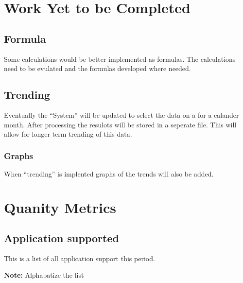\documentclass{article}
\begin{document}
\section{Work Yet to be Completed}
\subsection{Formula}
Some calculations would be better implemented as formulas. The calculations need
to be evulated and the formulas developed where needed.
\subsection{Trending}
Eventually the ``System'' will be updated to select the data on a for a calander
month. After processing the resulots will be stored in a seperate file.
This will allow for longer term trending of this data.
\subsubsection{Graphs}
When ``trending'' is implented graphs of the trends will also be added.


\section{Quanity Metrics}
\subsection{Application supported}
This is a list of all application support this period.

\textbf{Note:} Alphabatize the list
\end{document}
